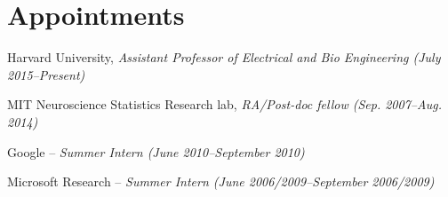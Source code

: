 \documentclass[11pt]{article}
\renewenvironment{itemize}{
  \begin{list}{}{
    \setlength{\itemsep}{0.25em}
    \setlength{\parskip}{0pt}
    \setlength{\parsep}{0.25em}
  }
}{
  \end{list}
}
\begin{document}


\section*{Appointments}

\begin{itemize}
    \item Harvard University, \emph{Assistant Professor of Electrical and Bio Engineering (July 2015--Present)}

    \item MIT Neuroscience Statistics Research lab, \emph{RA/Post-doc fellow (Sep. 2007--Aug. 2014)}

    \item Google -- \emph{Summer Intern (June 2010--September 2010)}

    \item Microsoft Research -- \emph{Summer Intern (June 2006/2009--September 2006/2009)}
\end{itemize}

%
%
%
\end{document}
